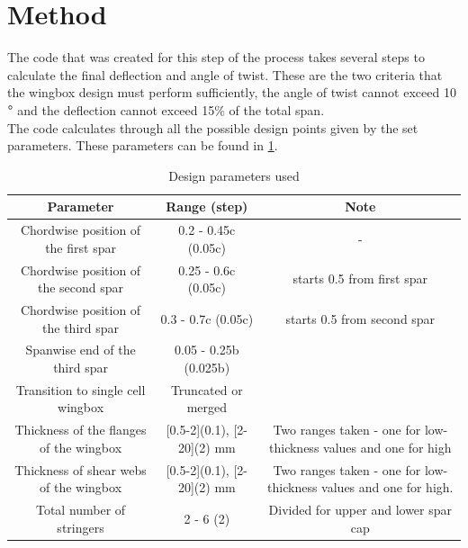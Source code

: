 \section{Method}




The code that was created for this step of the process takes several steps to calculate the final deflection and angle of twist. These are the two criteria that the wingbox design must perform sufficiently, the angle of twist cannot exceed 10$\degree$ and the deflection cannot exceed 15\% of the total span. \\

\noindent The code calculates through all the possible design points given by the set parameters. These parameters can be found in \ref{tab:design_parameters}.

\begin{table}[H]
    \caption{Design parameters used}
    \begin{tabular}{|c|c|c|}
        \hline
        \cellcolor{blue!15} Parameter & \cellcolor{blue!15} Range (step) & \cellcolor{blue!15} Note  \\
        \hline
        Chordwise position of the first spar & 0.2 - 0.45c (0.05c) & -\\
        \hline
        Chordwise position of the second spar & 0.25 - 0.6c (0.05c)  & starts 0.5 from first spar \\
        \hline
        Chordwise position of the third spar & 0.3 - 0.7c (0.05c) & starts 0.5 from second spar\\
        \hline
        Spanwise end of the third spar & 0.05 - 0.25b (0.025b) & \\
        \hline
        Transition to single cell wingbox & Truncated or merged  & \\
        \hline
        Thickness of the flanges of the wingbox & [0.5-2](0.1), [2-20](2) mm & Two ranges taken - one for low-thickness values and one for high\\
        \hline
        Thickness of shear webs of the wingbox & [0.5-2](0.1), [2-20](2) mm & Two ranges taken - one for low-thickness values and one for high. \\
        \hline
        Total number of stringers & 2 - 6 (2) & Divided for upper and lower spar cap\\
        \hline
    \end{tabular}
    \label{tab:design_parameters}
\end{table}


